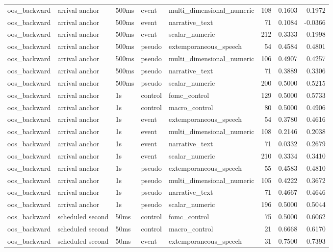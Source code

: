 \begin{tabular}{lllllrrr}
oos_backward & arrival anchor & 500ms & event & multi_dimensional_numeric & 108 & 0.1603 & 0.1972 \\
oos_backward & arrival anchor & 500ms & event & narrative_text & 71 & 0.1084 & -0.0366 \\
oos_backward & arrival anchor & 500ms & event & scalar_numeric & 212 & 0.3333 & 0.1998 \\
oos_backward & arrival anchor & 500ms & pseudo & extemporaneous_speech & 54 & 0.4584 & 0.4801 \\
oos_backward & arrival anchor & 500ms & pseudo & multi_dimensional_numeric & 106 & 0.4907 & 0.4257 \\
oos_backward & arrival anchor & 500ms & pseudo & narrative_text & 71 & 0.3889 & 0.3306 \\
oos_backward & arrival anchor & 500ms & pseudo & scalar_numeric & 200 & 0.5000 & 0.5215 \\
oos_backward & arrival anchor & 1s & control & fomc_control & 129 & 0.5000 & 0.5733 \\
oos_backward & arrival anchor & 1s & control & macro_control & 80 & 0.5000 & 0.4906 \\
oos_backward & arrival anchor & 1s & event & extemporaneous_speech & 54 & 0.3780 & 0.4616 \\
oos_backward & arrival anchor & 1s & event & multi_dimensional_numeric & 108 & 0.2146 & 0.2038 \\
oos_backward & arrival anchor & 1s & event & narrative_text & 71 & 0.0332 & 0.2679 \\
oos_backward & arrival anchor & 1s & event & scalar_numeric & 210 & 0.3334 & 0.3410 \\
oos_backward & arrival anchor & 1s & pseudo & extemporaneous_speech & 55 & 0.4583 & 0.4810 \\
oos_backward & arrival anchor & 1s & pseudo & multi_dimensional_numeric & 105 & 0.4222 & 0.3672 \\
oos_backward & arrival anchor & 1s & pseudo & narrative_text & 71 & 0.4667 & 0.4646 \\
oos_backward & arrival anchor & 1s & pseudo & scalar_numeric & 196 & 0.5000 & 0.5044 \\
oos_backward & scheduled second & 50ms & control & fomc_control & 75 & 0.5000 & 0.6062 \\
oos_backward & scheduled second & 50ms & control & macro_control & 21 & 0.6668 & 0.6170 \\
oos_backward & scheduled second & 50ms & event & extemporaneous_speech & 31 & 0.7500 & 0.7393 \\

\end{tabular}

